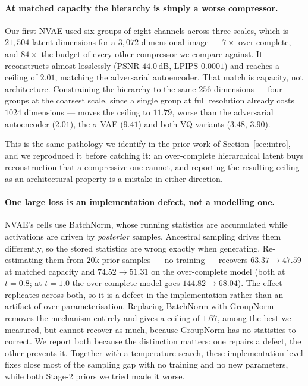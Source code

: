 \documentclass[sigconf,nonacm]{acmart}
\begin{document}
\paragraph{At matched capacity the hierarchy is simply a worse compressor.}
Our first NVAE used six groups of eight channels across three scales, which is
$21{,}504$ latent dimensions for a $3{,}072$-dimensional image --- $7\times$
over-complete, and $84\times$ the budget of every other compressor we compare
against. It reconstructs almost losslessly (PSNR $44.0$\,dB, LPIPS $0.0001$) and
reaches a ceiling of $2.01$, matching the adversarial autoencoder. That match is
capacity, not architecture. Constraining the hierarchy to the same $256$
dimensions --- four groups at the coarsest scale, since a single group at full
resolution already costs $1024$ dimensions --- moves the ceiling to $11.79$,
worse than the adversarial autoencoder ($2.01$), the $\sigma$-VAE ($9.41$) and
both VQ variants ($3.48$, $3.90$).

This is the same pathology we identify in the prior work of
Section~\ref{sec:intro}, and we reproduced it before catching it: an
over-complete hierarchical latent buys reconstruction that a compressive one
cannot, and reporting the resulting ceiling as an architectural property is a
mistake in either direction.

\paragraph{One large loss is an implementation defect, not a modelling one.}
NVAE's cells use BatchNorm, whose running statistics are accumulated while
activations are driven by \emph{posterior} samples. Ancestral sampling drives
them differently, so the stored statistics are wrong exactly when generating.
Re-estimating them from $20$k prior samples --- no training --- recovers
$63.37 \to 47.59$ at matched capacity and $74.52 \to 51.31$ on the
over-complete model (both at $t{=}0.8$; at $t{=}1.0$ the over-complete model goes $144.82 \to 68.04$). The effect replicates across both, so it is a defect in the
implementation rather than an artifact of over-parameterisation. Replacing
BatchNorm with GroupNorm removes the mechanism entirely and gives a ceiling of $1.67$,
among the best we measured, but cannot recover as much, because GroupNorm has
no statistics to correct. We report both because the distinction matters: one
repairs a defect, the other prevents it. Together with a temperature search,
these implementation-level fixes close most of the sampling gap with no training
and no new parameters, while both Stage-2 priors we tried made it worse.
\end{document}

